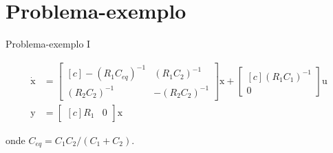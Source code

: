\documentclass[aspectratio=169,11pt,t,xcolor={usenames,dvipsnames,x11names}]{beamer}
\begin{document}
\begin{frame}[b]
	\begin{figure}
		\centering
		
		
	\end{figure}
\end{frame}

\section{Problema-exemplo}
\begin{frame}[c]{Problema-exemplo I}
	\begin{figure}
		\centering
		
	\end{figure}
	\pause
	\begin{subequations}
  \begin{align}
    \dot{\pmb{\mathrm{x}}} &= \begin{bmatrix*}[c]
      -(R_1C_{eq})^{-1} & (R_1C_2)^{-1}\\
      (R_2C_2)^{-1} & -(R_2C_2)^{-1}
    \end{bmatrix*}\pmb{\mathrm{x}} + \begin{bmatrix*}[c]
      (R_1C_1)^{-1}\\
      0
    \end{bmatrix*}\pmb{\mathrm{u}}\label{eq:SSTCEntrada}\\
    \pmb{\mathrm{y}} &= \begin{bmatrix*}[c]
      R_1 & 0
    \end{bmatrix*}\pmb{\mathrm{x}}\label{eq:SSTCSaida}
  \end{align}
\end{subequations}

onde $C_{eq} = C_1C_2/(C_1 + C_2)$.
\end{frame}
\end{document}
